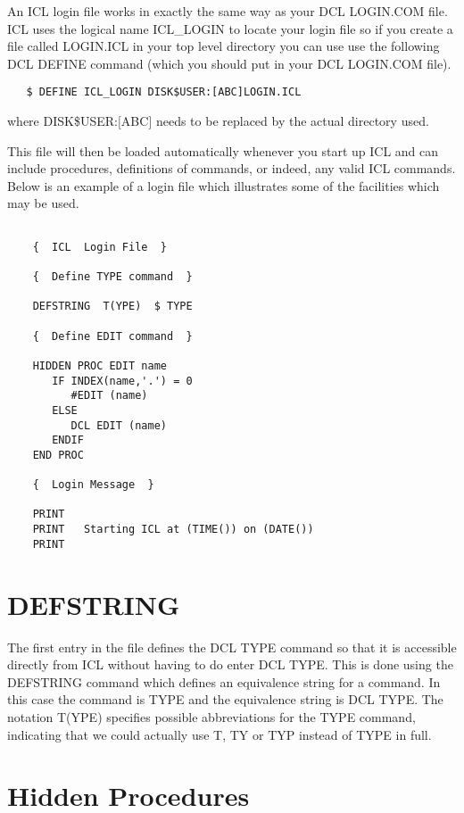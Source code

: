 An ICL login file works in exactly the same way as your DCL LOGIN.COM file. ICL
uses the logical name ICL\_LOGIN to locate your login file so if you create a
file called LOGIN.ICL in your top level directory you can use use the following
DCL DEFINE command (which you should put in your DCL LOGIN.COM file).
\begin{verbatim}
   $ DEFINE ICL_LOGIN DISK$USER:[ABC]LOGIN.ICL
\end{verbatim}
where DISK\$USER:$[$ABC$]$ needs to be replaced by the actual directory used.

This file will then be loaded automatically whenever you start up ICL and
can include procedures, definitions of commands, or indeed, any valid ICL
commands. Below is an example of a login file which illustrates some of
the facilities which may be used.
\begin{verbatim}

    {  ICL  Login File  }

    {  Define TYPE command  }

    DEFSTRING  T(YPE)  $ TYPE

    {  Define EDIT command  }

    HIDDEN PROC EDIT name
       IF INDEX(name,'.') = 0
          #EDIT (name)
       ELSE
          DCL EDIT (name)
       ENDIF
    END PROC

    {  Login Message  }

    PRINT 
    PRINT   Starting ICL at (TIME()) on (DATE())
    PRINT

\end{verbatim}
   
\section{DEFSTRING}

The first entry in the file defines the DCL TYPE command so that it is
accessible directly from ICL without having to do enter DCL TYPE. This is
done using the DEFSTRING command which defines an equivalence string for
a command. In this case the command is TYPE and the equivalence string is
DCL TYPE. The notation T(YPE) specifies possible abbreviations for the
TYPE command, indicating that we could actually use T, TY or TYP instead
of TYPE in full.

\section{Hidden Procedures}

